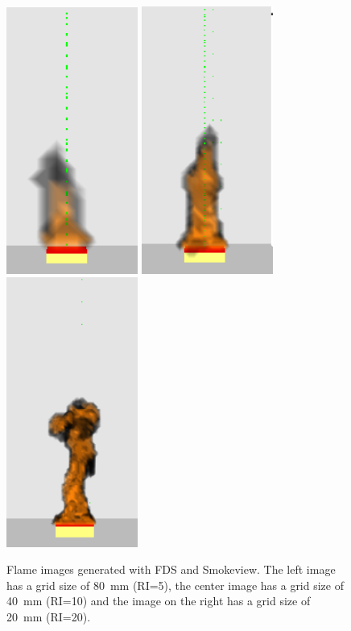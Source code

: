 \documentclass[twoside]{uocthesis}
\begin{document}
{\begin{figure}[ht!]
  \centering
  \includegraphics[width=1.7in]{../Figures/NG_80kW_GBWall_2D_RI=05_0601crop}
  \includegraphics[width=1.7in]{../Figures/NG_80kW_GBWall_2D_RI=10_0601crop}
  \includegraphics[width=1.7in]{../Figures/NG_80kW_GBWall_2D_RI=20_0601crop}\\
  \caption[Flame images generated with FDS and Smokeview]{Flame images generated with FDS and Smokeview. The left image has a grid size of 80~mm (RI=5), the center image has a grid size of 40~mm (RI=10) and the image on the right has a grid size of 20~mm (RI=20).}
  \label{FDS_Flame_Image_comp}
\end{figure}

}
\end{document}
